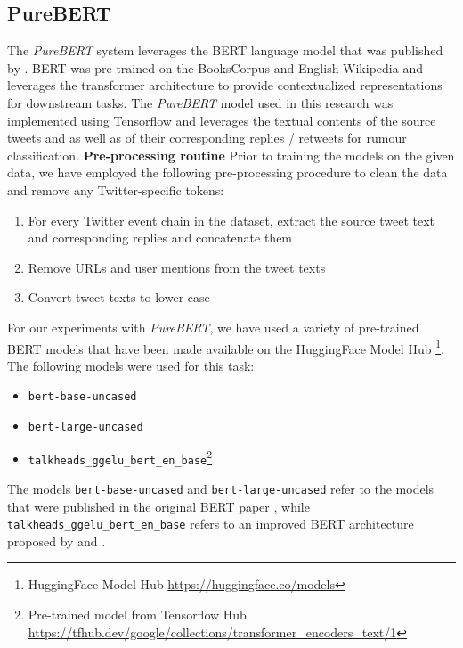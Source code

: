 \documentclass[11pt,a4paper]{article}
\begin{document}
\subsection{PureBERT}
\label{sec:purebert}
The \textit{PureBERT} system leverages the BERT language model that was published by \citet{RN688}. BERT was pre-trained on the BooksCorpus \citep{RN689} and English Wikipedia and leverages the transformer architecture to provide contextualized representations for downstream tasks.
\newline
The \textit{PureBERT} model used in this research was implemented using Tensorflow \citep{RN681} and leverages the textual contents of the source tweets and as well as of their corresponding replies / retweets for rumour classification. 
\newline
\newline
\textbf{Pre-processing routine}
\newline
Prior to training the models on the given data, we have employed the following pre-processing procedure to clean the data and remove any Twitter-specific tokens:
\begin{enumerate}[noitemsep]
    \item For every Twitter event chain in the dataset, extract the source tweet text and corresponding replies and concatenate them 
    \item Remove URLs and user mentions from the tweet texts
    \item Convert tweet texts to lower-case
\end{enumerate}
For our experiments with \textit{PureBERT}, we have used a variety of pre-trained BERT models that have been made available on the HuggingFace Model Hub \footnote{HuggingFace Model Hub \url{https://huggingface.co/models}}. The following models were used for this task:
\begin{itemize}[noitemsep,topsep=2pt,parsep=0pt,partopsep=0pt]
    \item \verb|bert-base-uncased|
    \item \verb|bert-large-uncased|
    \item \verb|talkheads_ggelu_bert_en_base|\footnote{Pre-trained model from Tensorflow Hub \url{https://tfhub.dev/google/collections/transformer_encoders_text/1}}
\end{itemize}
The models \verb|bert-base-uncased| and \verb|bert-large-uncased| refer to the models that were published in the original BERT paper \citep{RN688}, while \verb|talkheads_ggelu_bert_en_base| refers to an improved BERT architecture proposed by \citet{RN685} and \citet{RN686}.
\end{document}
